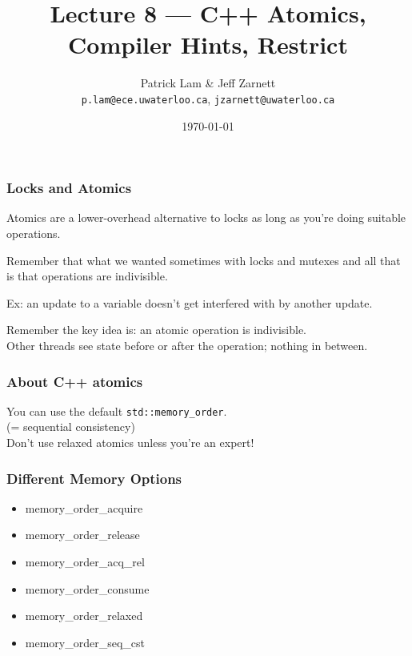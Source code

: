 

\title{Lecture 8 --- C++ Atomics, Compiler Hints, Restrict}

\author{Patrick Lam \& Jeff Zarnett \\ \small \texttt{p.lam@ece.uwaterloo.ca}, \texttt{jzarnett@uwaterloo.ca}}
\date{\today}




\begin{frame}
  \titlepage

 \end{frame}
 
 

\begin{frame}
\frametitle{Locks and Atomics}

 Atomics are a lower-overhead alternative to
locks as long as you're doing suitable operations. 

Remember that what we wanted sometimes with locks and mutexes and all that is that operations are indivisible.

Ex: an update to a variable doesn't get interfered with by another update. 

Remember the key idea is: an \alert{atomic operation} is indivisible.\\
\quad Other threads see state before or after the operation; nothing in between.

\end{frame}


\begin{frame}[fragile]
  \frametitle{About C++ atomics}
  
    You can use the default {\tt std::memory\_order}.\\
    (= sequential consistency)\\[1em]

    \alert{Don't use relaxed atomics unless you're an expert!}\\[1em]
    
\end{frame}



\begin{frame}
\frametitle{Different Memory Options}

\begin{itemize}
		\item memory\_order\_acquire
		\item memory\_order\_release
		\item memory\_order\_acq\_rel
		\item memory\_order\_consume
		\item memory\_order\_relaxed
		\item memory\_order\_seq\_cst
\end{itemize}

\end{frame}

